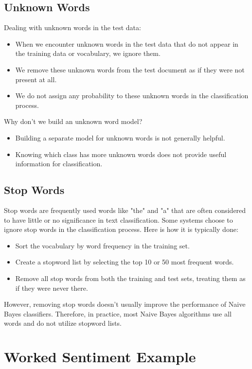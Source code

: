 \subsection{Unknown Words}
Dealing with unknown words in the test data:
\begin{itemize}
    \item When we encounter unknown words in the test data that do not appear in the training data or vocabulary, we ignore them.
    \item We remove these unknown words from the test document as if they were not present at all.
    \item We do not assign any probability to these unknown words in the classification process.
\end{itemize}

Why don't we build an unknown word model?
\begin{itemize}
    \item Building a separate model for unknown words is not generally helpful.
    \item Knowing which class has more unknown words does not provide useful information for classification.
\end{itemize}

\subsection{Stop Words}

Stop words are frequently used words like "the" and "a" that are often considered to have little or no significance in text classification. Some systems choose to ignore stop words in the classification process. Here is how it is typically done:

\begin{itemize}
    \item Sort the vocabulary by word frequency in the training set.
    \item Create a stopword list by selecting the top 10 or 50 most frequent words.
    \item Remove all stop words from both the training and test sets, treating them as if they were never there.
\end{itemize}

However, removing stop words doesn't usually improve the performance of Naive Bayes classifiers. Therefore, in practice, most Naive Bayes algorithms use all words and do not utilize stopword lists.


\section{Worked Sentiment Example}

